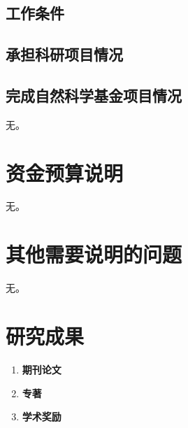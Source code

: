 \documentclass[a4paper,11pt]{article}
\begin{document}
\subsection{工作条件}

\subsection{承担科研项目情况}

\subsection{完成自然科学基金项目情况}

无。
\section{资金预算说明}

无。
\section{其他需要说明的问题}
无。

\newpage
\section*{研究成果}

\begin{enumerate}
\item \textbf{期刊论文}



\item \textbf{专著}


\item \textbf{学术奖励}


\end{enumerate}
\end{document}

